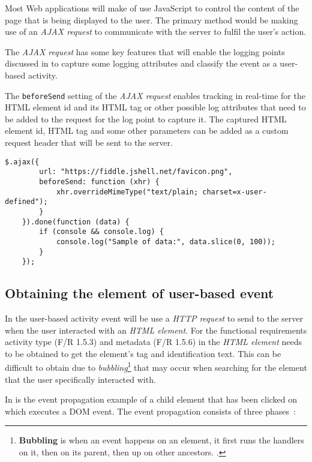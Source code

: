 Most Web applications will make of use JavaScript to control the content of the page that is being displayed to the user. The primary method would be making use of an \textit{AJAX request} to communicate with the server to fulfil the user's action.\par The \textit{AJAX request} has some key features that will enable the logging points discussed in  to capture some logging attributes and classify the event as a user-based activity. \par The \texttt{beforeSend} setting of the \textit{AJAX request} enables tracking in real-time for the HTML element id and its HTML tag or other possible log attributes that need to be added to the request for the log point to capture it. The captured HTML element id, HTML tag and some other parameters can be added as a custom request header that will be sent to the server.

\begin{lstlisting}[caption={\textit{AJAX request example \cite{API.jQuery2022}}}, label={fig:ch2_ajaxBeforesend}]  
	$.ajax({
		url: "https://fiddle.jshell.net/favicon.png",
		beforeSend: function (xhr) {
			xhr.overrideMimeType("text/plain; charset=x-user-defined");
		}
	}).done(function (data) {
		if (console && console.log) {
			console.log("Sample of data:", data.slice(0, 100));
		}
	});
\end{lstlisting}

\subsection{Obtaining the element of user-based event}\label{sec:ch2_ElementObtaining}
In  the user-based activity event will be use a \textit{HTTP request} to send to the server when the user interacted with an \textit{HTML element}. For the functional requirements activity type (F/R 1.5.3) and metadata (F/R 1.5.6) in  the \textit{HTML element} needs to be obtained to get the element's tag and identification text. This can be difficult to obtain due to \textit{bubbling}\footnote{\textbf{Bubbling} is when an event happens on an element, it first runs the handlers on it, then on its parent, then up on other ancestors. \cite{EventBubbling}.} that may occur when searching for the element that the user specifically interacted with.\par In  is the event propagation example of a child element that has been clicked on which executes a DOM event. The event propagation consists of three phases~\cite{EventBubbling}:


